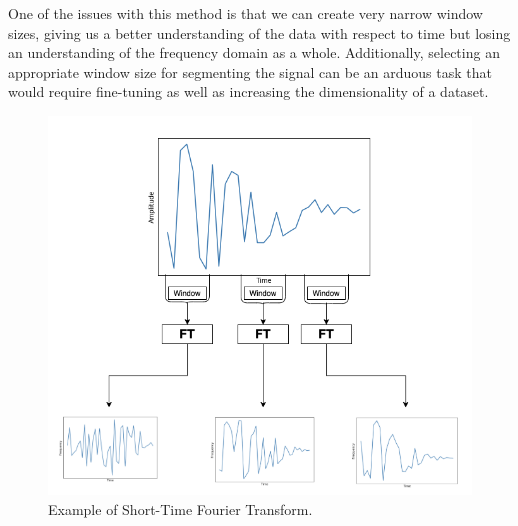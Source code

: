 \documentclass{turabian-thesis}
\begin{document}
One of the issues with this method is that we can create very narrow window sizes, giving us a better understanding of the data with respect to time but losing an understanding of the frequency domain as a whole. Additionally, selecting an appropriate window size for segmenting the signal can be an arduous task that would require fine-tuning as well as increasing the dimensionality of a dataset.


\begin{figure}[h]
   \begin{center}
      \includegraphics[scale=0.6]{../media/stft.png}
   \end{center}
   \caption{Example of Short-Time Fourier Transform.}
   \label{fig:stft_example}
\end{figure}

\end{document}

